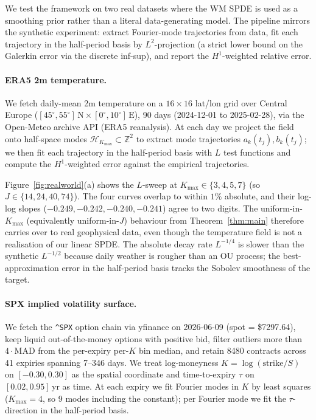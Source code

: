 We test the framework on two real datasets where the WM SPDE is used as
a smoothing prior rather than a literal data-generating model. The
pipeline mirrors the synthetic experiment: extract Fourier-mode
trajectories from data, fit each trajectory in the half-period basis
by $L^2$-projection (a strict lower bound on the Galerkin error via the
discrete inf-sup), and report the $H^1$-weighted relative error.

\paragraph{ERA5 2m temperature.}
We fetch daily-mean 2m temperature on a $16{\times}16$ lat/lon grid over
Central Europe ($[45^{\circ}, 55^{\circ}]\,\mathrm{N} \times [0^{\circ}, 10^{\circ}]\,\mathrm{E}$),
90 days (2024-12-01 to 2025-02-28), via the Open-Meteo archive API
(ERA5 reanalysis). At each day we project the field onto half-space
modes $\mathcal{H}_{K_{\max}} \subset \mathbb{Z}^2$ to extract mode
trajectories $a_k(t_j), b_k(t_j)$; we then fit each trajectory in the
half-period basis with $L$ test functions and compute the
$H^1$-weighted error against the empirical trajectories.

Figure~\ref{fig:realworld}(a) shows the $L$-sweep at
$K_{\max} \in \{3, 4, 5, 7\}$ (so $J \in \{14, 24, 40, 74\}$). The four
curves overlap to within $1\%$ absolute, and their log-log slopes
($-0.249, -0.242, -0.240, -0.241$) agree to two digits. The
uniform-in-$K_{\max}$ (equivalently uniform-in-$J$) behaviour from
Theorem~\ref{thm:main} therefore carries over to real geophysical data,
even though the temperature field is not a realisation of our linear
SPDE. The absolute decay rate $L^{-1/4}$ is slower than the synthetic
$L^{-1/2}$ because daily weather is rougher than an OU process; the
best-approximation error in the half-period basis tracks the Sobolev
smoothness of the target.

\paragraph{SPX implied volatility surface.}
We fetch the \texttt{\textasciicircum{}SPX} option chain via yfinance on 2026-06-09
(spot = \$7297.64), keep liquid out-of-the-money options with positive
bid, filter outliers more than $4\cdot\mathrm{MAD}$ from the per-expiry
per-$K$ bin median, and retain 8480 contracts across 41 expiries
spanning 7--346 days. We treat log-moneyness $K = \log(\mathrm{strike}/S)$
on $[-0.30, 0.30]$ as the spatial coordinate and time-to-expiry $\tau$
on $[0.02, 0.95]\,\mathrm{yr}$ as time. At each expiry we fit Fourier
modes in $K$ by least squares ($K_{\max} = 4$, so 9 modes including the
constant); per Fourier mode we fit the $\tau$-direction in the
half-period basis.


